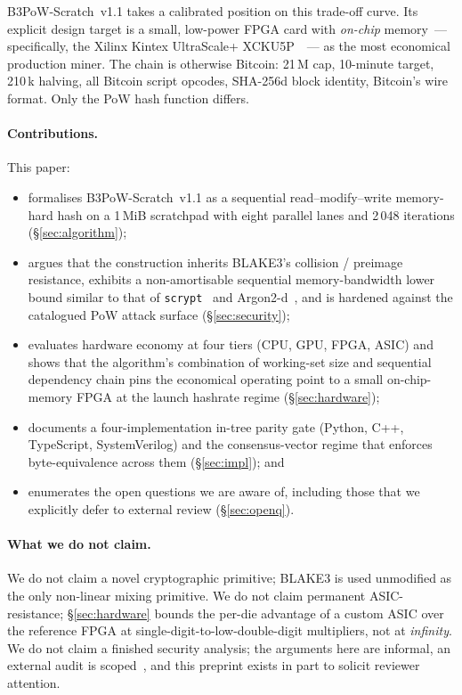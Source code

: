 \documentclass[11pt,a4paper]{article}
\theoremstyle{plain}
\theoremstyle{definition}
\theoremstyle{remark}
\begin{document}
B3PoW-Scratch~v1.1 takes a calibrated position on this trade-off
curve. Its explicit design target is a small, low-power FPGA card
with \emph{on-chip} memory~--- specifically, the Xilinx Kintex
UltraScale+ XCKU5P~\cite{xilinx-ku5p}~--- as the most economical
production miner. The chain is otherwise Bitcoin: 21\,M cap,
10-minute target, 210\,k halving, all Bitcoin script opcodes,
SHA-256d block identity, Bitcoin's wire format. Only the PoW hash
function differs.

\paragraph{Contributions.} This paper:
\begin{itemize}\itemsep0.2em
\item formalises B3PoW-Scratch~v1.1 as a sequential read--modify--write
      memory-hard hash on a 1\,MiB scratchpad with eight parallel
      lanes and 2\,048 iterations
      (\S\ref{sec:algorithm});
\item argues that the construction inherits BLAKE3's collision /
      preimage resistance, exhibits a non-amortisable sequential
      memory-bandwidth lower bound similar to that of
      \texttt{scrypt}~\cite{percival2009scrypt} and
      Argon2-d~\cite{biryukov2016argon2}, and is hardened against the
      catalogued PoW attack surface (\S\ref{sec:security});
\item evaluates hardware economy at four tiers (CPU, GPU, FPGA, ASIC)
      and shows that the algorithm's combination of working-set size
      and sequential dependency chain pins the economical operating
      point to a small on-chip-memory FPGA at the launch hashrate
      regime (\S\ref{sec:hardware});
\item documents a four-implementation in-tree parity gate (Python,
      C++, TypeScript, SystemVerilog) and the consensus-vector
      regime that enforces byte-equivalence across them
      (\S\ref{sec:impl}); and
\item enumerates the open questions we are aware of, including those
      that we explicitly defer to external review
      (\S\ref{sec:openq}).
\end{itemize}

\paragraph{What we do not claim.} We do not claim a novel
cryptographic primitive; BLAKE3 is used unmodified as the only
non-linear mixing primitive. We do not claim permanent
ASIC-resistance; \S\ref{sec:hardware} bounds the per-die advantage of
a custom ASIC over the reference FPGA at single-digit-to-low-double-digit
multipliers, not at \emph{infinity}. We do not claim a finished
security analysis; the arguments here are informal, an external audit
is scoped~\cite{b3chain-auditscope}, and this preprint exists in part
to solicit reviewer attention.
\end{document}

